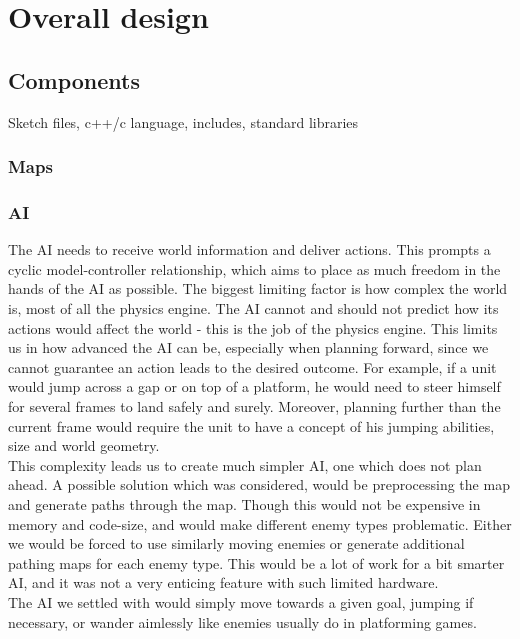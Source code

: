 \chapter{Overall design}

\section{Components}
Sketch files, c++/c language, includes, standard libraries
\subsection{Maps}

\subsection{AI} %
The AI needs to receive world information and deliver actions. This prompts a cyclic model-controller relationship, which aims to place as much freedom in the hands of the AI as possible. The biggest limiting factor is how complex the world is, most of all the physics engine. The AI cannot and should not predict how its actions would affect the world - this is the job of the physics engine. This limits us in how advanced the AI can be, especially when planning forward, since we cannot guarantee an action leads to the desired outcome. For example, if a unit would jump across a gap or on top of a platform, he would need to steer himself for several frames to land safely and surely. Moreover, planning further than the current frame would require the unit to have a concept of his jumping abilities, size and world geometry.\\
This complexity leads us to create much simpler AI, one which does not plan ahead. A possible solution which was considered, would be preprocessing the map and generate paths through the map. Though this would not be expensive in memory and code-size, and would make different enemy types problematic. Either we would be forced to use similarly moving enemies or generate additional pathing maps for each enemy type. This would be a lot of work for a bit smarter AI, and it was not a very enticing feature with such limited hardware.\\
The AI we settled with would simply move towards a given goal, jumping if necessary, or wander aimlessly like enemies usually do in platforming games.


